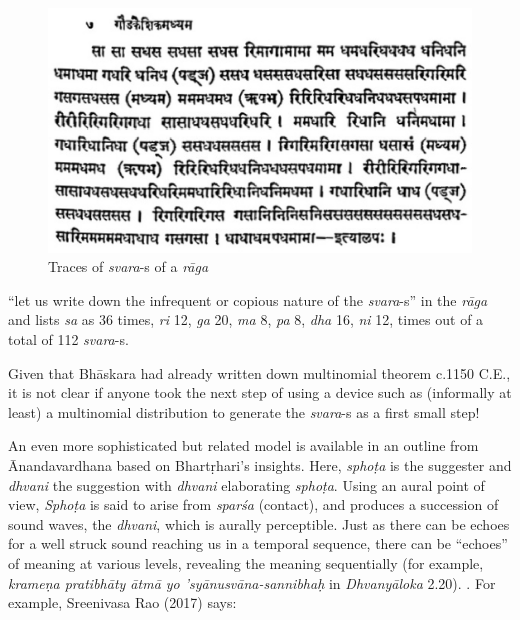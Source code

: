 \begin{figure}[phb]
\centering
\includegraphics[scale=.5]{figures/6.eps}
\caption{Traces of \textsl{svara}-s of a \textsl{rāga}}\label{chap3-fig4}
\end{figure}

“let us write down the infrequent or copious nature of the \textsl{svara}-s” in the \textsl{rāga} and lists \textsl{sa} as 36 times, \textsl{ri} 12, \textsl{ga} 20, \textsl{ma} 8, \textsl{pa} 8, \textsl{dha} 16, \textsl{ni} 12, times out of a total of 112 \textsl{svara}-s. 
\vskip 2pt

Given that Bhāskara had already written down multinomial theorem c.1150 C.E., it is not clear if anyone took the next step of using a device such as (informally at least) a multinomial distribution to generate the \textsl{svara}-s as a first small step!

An even more sophisticated but related model is available in an outline from Ānandavardhana based on Bhartṛhari's insights. Here, \textsl{sphoṭa} is the suggester and \textsl{dhvani} the suggestion with \textsl{dhvani} elaborating \textsl{sphoṭa}. Using an aural point of view, \textsl{Sphoṭa} is said to arise from \textsl{sparśa} (contact), and produces a succession of sound waves, the \textsl{dhvani}, which is aurally perceptible. Just as there can be echoes for a well struck sound reaching us in a temporal sequence, there can be “echoes” of meaning at various levels, revealing the meaning sequentially (for example, \textsl{krameṇa pratibhāty ātmā yo 'syānusvāna-sannibhaḥ} in \textsl{Dhvanyāloka} 2.20). . For example, Sreenivasa Rao (2017) says:


